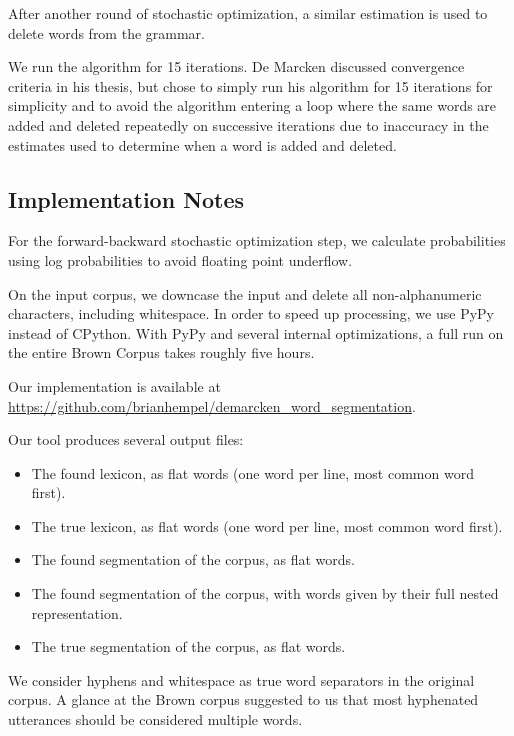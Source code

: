 \documentclass[11pt, oneside, fleqn]{article}
\begin{document}
  After another round of stochastic optimization, a similar estimation is used to delete words from the grammar. 
  
  We run the algorithm for 15 iterations. De Marcken discussed convergence criteria in his thesis, but chose to simply run his algorithm for 15 iterations for simplicity and to avoid the algorithm entering a loop where the same words are added and deleted repeatedly on successive iterations due to inaccuracy in the estimates used to determine when a word is added and deleted.
  
  \subsection{Implementation Notes}
  
  For the forward-backward stochastic optimization step, we calculate probabilities using log probabilities to avoid floating point underflow.

  On the input corpus, we downcase the input and delete all non-alphanumeric characters, including whitespace. In order to speed up processing, we use PyPy instead of CPython. With PyPy and several internal optimizations, a full run on the entire Brown Corpus takes roughly five hours.
  
  Our implementation is available at \href{https://github.com/brianhempel/demarcken_word_segmentation}{https://github.com/brianhempel/demarcken\_word\_segmentation}.
  
  Our tool produces several output files:

  \begin{itemize}
    \item The found lexicon, as flat words (one word per line, most common word first).
    \item The true lexicon, as flat words (one word per line, most common word first).
    \item The found segmentation of the corpus, as flat words.
    \item The found segmentation of the corpus, with words given by their full nested representation.
    \item The true segmentation of the corpus, as flat words. 
  \end{itemize}

	We consider hyphens and whitespace as true word separators in the original corpus. A glance at the Brown corpus suggested to us that most hyphenated utterances should be considered multiple words.
\end{document}

